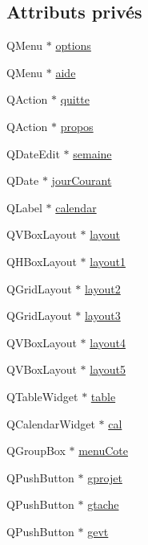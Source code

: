 \subsection*{Attributs privés}
\begin{DoxyCompactItemize}
\item 
Q\+Menu $\ast$ \hyperlink{class_interface_a5c22d42f0a82b546269f2265dc4020bf}{options}
\item 
Q\+Menu $\ast$ \hyperlink{class_interface_a8e1bd8a8cfb02dd361ece990addd7515}{aide}
\item 
Q\+Action $\ast$ \hyperlink{class_interface_af2d5dd8a8ec08aca6ef98b14657b2d03}{quitte}
\item 
Q\+Action $\ast$ \hyperlink{class_interface_a2282b9ebbfc4d6b78aff0c4f09edf3ef}{propos}
\item 
Q\+Date\+Edit $\ast$ \hyperlink{class_interface_ac4ca6cf95990077c3c695f54b9340d46}{semaine}
\item 
Q\+Date $\ast$ \hyperlink{class_interface_a25db9c3292f0f8d545d0241f11a59293}{jour\+Courant}
\item 
Q\+Label $\ast$ \hyperlink{class_interface_a0b7d1dff057048c33ff74e0eb8919378}{calendar}
\item 
Q\+V\+Box\+Layout $\ast$ \hyperlink{class_interface_a4d03301a342f9024c1e39009f127a5ec}{layout}
\item 
Q\+H\+Box\+Layout $\ast$ \hyperlink{class_interface_aeb8ae11dbb700b6a19c303a39f80999c}{layout1}
\item 
Q\+Grid\+Layout $\ast$ \hyperlink{class_interface_a99dba2dd8a820785420c7b16677b18a6}{layout2}
\item 
Q\+Grid\+Layout $\ast$ \hyperlink{class_interface_a296d3fd708454c14456b50c56d3f87c4}{layout3}
\item 
Q\+V\+Box\+Layout $\ast$ \hyperlink{class_interface_a723b35155d78820333a349c15f66c4e9}{layout4}
\item 
Q\+V\+Box\+Layout $\ast$ \hyperlink{class_interface_ab996ff872c831e183bace04cc136bb49}{layout5}
\item 
Q\+Table\+Widget $\ast$ \hyperlink{class_interface_add370ece6c97151da99ebab84362c6a1}{table}
\item 
Q\+Calendar\+Widget $\ast$ \hyperlink{class_interface_a53a4b3fb1f0885aea0395658a4b36022}{cal}
\item 
Q\+Group\+Box $\ast$ \hyperlink{class_interface_a2f0340a091c08fb4d6c3357fbd156d21}{menu\+Cote}
\item 
Q\+Push\+Button $\ast$ \hyperlink{class_interface_aa11e7c29121814ee23bafd43ab68b534}{gprojet}
\item 
Q\+Push\+Button $\ast$ \hyperlink{class_interface_ae73e719e89ebafb21c0330d1d1b32228}{gtache}
\item 
Q\+Push\+Button $\ast$ \hyperlink{class_interface_a5ad660e0308903af33f1e40daa239010}{gevt}
\end{DoxyCompactItemize}


